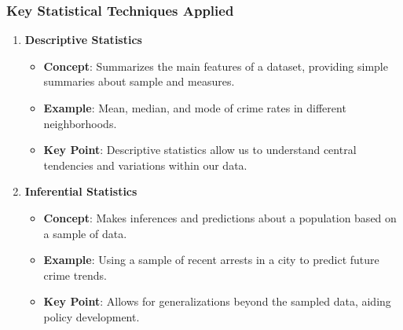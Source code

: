 \documentclass[aspectratio=169]{beamer}
\begin{document}
\begin{frame}[fragile]
    \frametitle{Key Statistical Techniques Applied}
    \begin{enumerate}
        \item \textbf{Descriptive Statistics}
            \begin{itemize}
                \item \textbf{Concept}: Summarizes the main features of a dataset, providing simple summaries about sample and measures.
                \item \textbf{Example}: Mean, median, and mode of crime rates in different neighborhoods.
                \item \textbf{Key Point}: Descriptive statistics allow us to understand central tendencies and variations within our data.
            \end{itemize}
        
        \item \textbf{Inferential Statistics}
            \begin{itemize}
                \item \textbf{Concept}: Makes inferences and predictions about a population based on a sample of data.
                \item \textbf{Example}: Using a sample of recent arrests in a city to predict future crime trends.
                \item \textbf{Key Point}: Allows for generalizations beyond the sampled data, aiding policy development.
            \end{itemize}
    \end{enumerate}
\end{frame}
\end{document}
